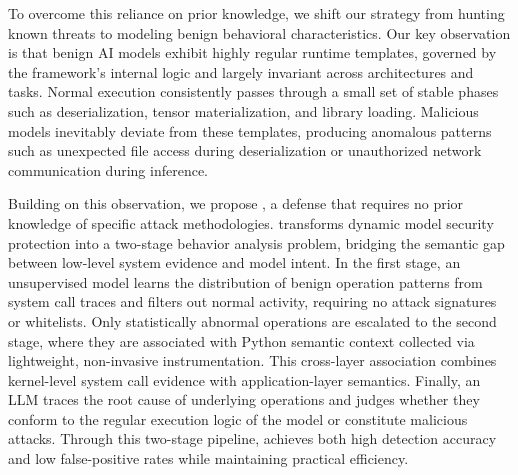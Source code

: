 
To overcome this reliance on prior knowledge, we shift our strategy from hunting known threats to modeling benign behavioral characteristics. Our key observation is that benign AI models exhibit highly regular runtime templates, governed by the framework's internal logic and largely invariant across architectures and tasks. Normal execution consistently passes through a small set of stable phases such as deserialization, tensor materialization, and library loading. Malicious models inevitably deviate from these templates, producing anomalous patterns such as unexpected file access during deserialization or unauthorized network communication during inference.

Building on this observation, we propose \toolname{}, a defense that requires no prior knowledge of specific attack methodologies. \toolname{} transforms dynamic model security protection into a two-stage behavior analysis problem, bridging the semantic gap between low-level system evidence and model intent. In the first stage, an unsupervised model learns the distribution of benign operation patterns from system call traces and filters out normal activity, requiring no attack signatures or whitelists. Only statistically abnormal operations are escalated to the second stage, where they are associated with Python semantic context collected via lightweight, non-invasive instrumentation. This cross-layer association combines kernel-level system call evidence with application-layer semantics. Finally, an LLM traces the root cause of underlying operations and judges whether they conform to the regular execution logic of the model or constitute malicious attacks. Through this two-stage pipeline, \toolname{} achieves both high detection accuracy and low false-positive rates while maintaining practical efficiency.


